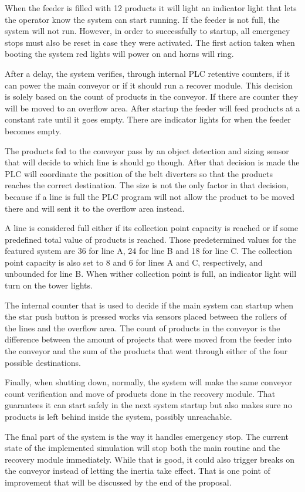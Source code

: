 When the feeder is filled with 12 products it will light an indicator light that lets the operator know the system can start running. If the feeder is not full, the system will not run. However, in order to successfully to startup, all emergency stops must also be reset in case they were activated. The first action taken when booting the system red lights will power on and horns will ring. 

After a delay, the system verifies, through internal PLC retentive counters, if it can power the main conveyor or if it should run a recover module. This decision is solely based on the count of products in the conveyor. If there are counter they will be moved to an overflow area. After startup the feeder will feed products at a constant rate until it goes empty. There are indicator lights for when the feeder becomes empty.

The products fed to the conveyor pass by an object detection and sizing sensor that will decide to which line is should go though. After that decision is made the PLC will coordinate the position of the belt diverters so that the products reaches the correct destination. The size is not the only factor in that decision, because if a line is full the PLC program will not allow the product to be moved there and will sent it to the overflow area instead.

A line is considered full either if its collection point capacity is reached or if some predefined total value of products is reached. Those predetermined values for the featured system are 36 for line A, 24 for line B and 18 for line C. The collection point capacity is also set to 8 and 6 for lines A and C, respectively, and unbounded for line B. When wither collection point is full, an indicator light will turn on the tower lights.

The internal counter that is used to decide if the main system can startup when the star push button is pressed works via sensors placed between the rollers of the lines and the overflow area. The count of products in the conveyor is the difference between the amount of projects that were moved from the feeder into the conveyor and the sum of the products that went through either of the four possible destinations.


Finally, when shutting down, normally, the system will make the same conveyor count verification and move of products done in the recovery module. That guarantees it can start safely in the next system startup but also makes sure no products is left behind inside the system, possibly unreachable. 

The final part of the system is the way it handles emergency stop. The current state of the implemented simulation will stop both the main routine and the recovery module immediately. While that is good, it could also trigger breaks on the conveyor instead of letting the inertia take effect. That is one point of improvement that will be discussed by the end of the proposal.










